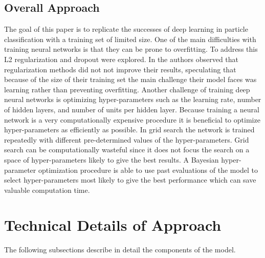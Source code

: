 \documentclass[12pt,letterpaper]{article}
\begin{document}
\subsection{Overall Approach}

The goal of this paper is to replicate the successes of deep learning in particle classification with a training set of limited size. One of the main difficulties with training neural networks is that they can be prone to overfitting.  To address this L2 regularization and dropout were explored.  In \cite{Baldi:2014pta} the authors observed that regularization methods did not not improve their results, speculating that because of the size of their training set the main challenge their model faces was learning rather than preventing overfitting.  Another challenge of training deep neural networks is optimizing hyper-parameters such as the learning rate, number of hidden layers, and number of units per hidden layer.  Because training a neural network is a very computationally expensive procedure it is beneficial to optimize hyper-parameters as efficiently as possible.  In grid search the network is trained repeatedly with different pre-determined values of the hyper-parameters.  Grid search can be computationally wasteful since it does not focus the search on a space of hyper-parameters likely to give the best results.  A Bayesian hyper-parameter optimization procedure is able to use past evaluations of the model to select hyper-parameters most likely to give the best performance which can save valuable computation time.

\section{Technical Details of Approach}

The following subsections describe in detail the components of the model. 
\end{document}
